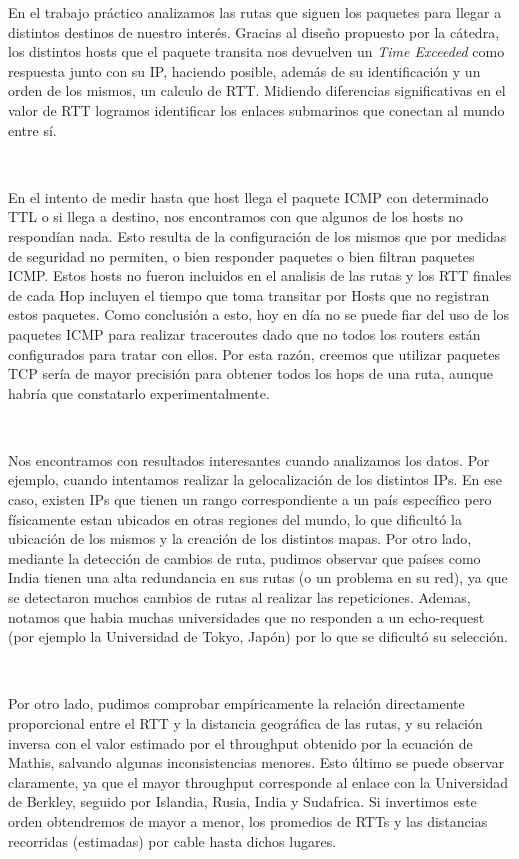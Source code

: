 En el trabajo práctico analizamos las rutas que siguen los paquetes para llegar a distintos destinos de nuestro interés. Gracias al diseño propuesto por la cátedra, los distintos hosts que el paquete transita nos devuelven un \textit{Time Exceeded} como respuesta junto con su IP, haciendo posible, además de su identificación y un orden de los mismos, un calculo de RTT. Midiendo diferencias significativas en el valor de RTT logramos identificar los enlaces submarinos que conectan al mundo entre sí.

~

En el intento de medir hasta que host llega el paquete ICMP con determinado TTL o si llega a destino, nos encontramos con que algunos de los hosts no respondían nada. Esto resulta de la configuración de los mismos que por medidas de seguridad no permiten, o bien responder paquetes o bien filtran paquetes ICMP. Estos hosts no fueron incluidos en el analisis de las rutas y los RTT finales de cada Hop incluyen el tiempo que toma transitar por Hosts que no registran estos paquetes. Como conclusión a esto, hoy en día no se puede fiar del uso de los paquetes ICMP para realizar traceroutes dado que no todos los routers están configurados para tratar con ellos. Por esta razón, creemos que utilizar paquetes TCP sería de mayor precisión para obtener todos los hops de una ruta, aunque habría que constatarlo experimentalmente.

~

Nos encontramos con resultados interesantes cuando analizamos los datos. Por ejemplo, cuando intentamos realizar la gelocalización de los distintos IPs. En ese caso, existen IPs que tienen un rango correspondiente a un país específico pero físicamente estan ubicados en otras regiones del mundo, lo que dificultó la ubicación de los mismos y la creación de los distintos mapas. Por otro lado, mediante la detección de cambios de ruta, pudimos observar que países como India tienen una alta redundancia en sus rutas (o un problema en su red), ya que se detectaron muchos cambios de rutas al realizar las repeticiones. Ademas, notamos que habia muchas universidades que no responden a un echo-request (por ejemplo la Universidad de Tokyo, Japón) por lo que se dificultó su selección.

~

Por otro lado, pudimos comprobar empíricamente la relación directamente proporcional entre el RTT y la distancia geográfica de las rutas, y su relación inversa con el valor estimado por el throughput obtenido por la ecuación de Mathis, salvando algunas inconsistencias menores. Esto último se puede observar claramente, ya que el mayor throughput corresponde al enlace con la Universidad de Berkley, seguido por Islandia, Rusia, India y Sudafrica. Si invertimos este orden obtendremos de mayor a menor, los promedios de RTTs y las distancias recorridas (estimadas) por cable hasta dichos lugares.


